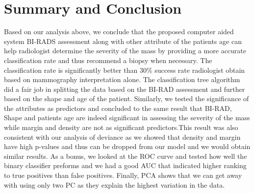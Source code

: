 \documentclass[a4paper, 12pt, one column, aas_macros]{article}
\begin{document}
\section{Summary and Conclusion}
Based on our analysis above, we conclude that the proposed computer aided system BI-RADS assessment along with other attribute of the patients age can help radiologist determine the severity of the mass by providing a more accurate classification rate and thus recommend a biopsy when necessary. The classification rate is significantly better than 30\% success rate radiologist obtain based on mammography interpretation alone. The classification tree algorithm did a fair job in splitting the data based on the BI-RAD assessment and further based on the shape and age of the patient. Similarly, we tested the significance of the attributes as predictors and concluded to the same result that BI-RAD, Shape and patients age are indeed significant in assessing the severity of the mass while margin and density are not as significant predictors.This result was also consistent with our analysis of deviance as we showed that density and margin have high p-values and thus can be dropped from our model and we would obtain similar results. As a bonus, we looked at the ROC curve and tested how well the binary classifier preforms and we had a good AUC that indicated higher ranking to true positives than false positives. Finally, PCA shows that we can get away with using only two PC as they explain the highest variation in the data.      












 \pagebreak

\end{document}

